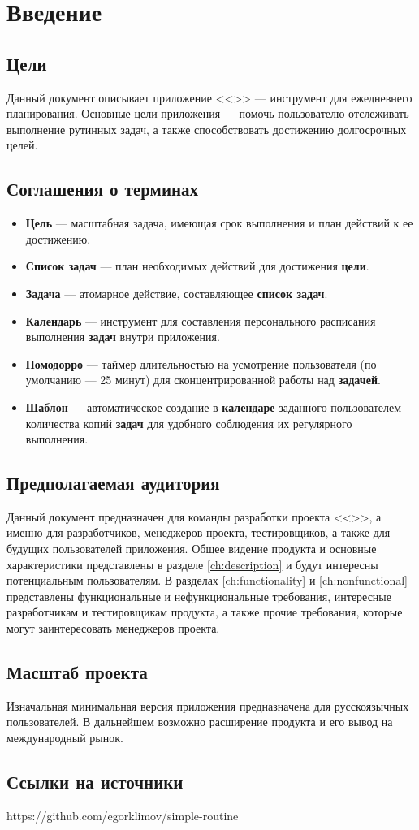 \chapter{Введение}
\section{Цели}
Данный документ описывает приложение <<\vProjectName>> --- инструмент для ежедневнего планирования. Основные цели приложения --- помочь пользователю отслеживать выполнение рутинных задач, а также способствовать достижению долгосрочных целей.

\section{Соглашения о терминах}
\begin{itemize}
    \item \textbf{Цель} --- масштабная задача, имеющая срок выполнения и план действий к ее достижению.
    \item \textbf{Список задач} --- план необходимых действий для достижения \textbf{цели}.
    \item \textbf{Задача} --- атомарное действие, составляющее \textbf{список задач}.
    \item \textbf{Календарь} --- инструмент для составления персонального расписания выполнения \textbf{задач} внутри приложения.
    \item \textbf{Помодорро} --- таймер длительностью на усмотрение пользователя (по умолчанию --- 25 минут) для сконцентрированной работы над \textbf{задачей}.
    \item \textbf{Шаблон} --- автоматическое создание в \textbf{календаре} заданного пользователем количества копий \textbf{задач} для удобного соблюдения их регулярного выполнения.
\end{itemize}


\section{Предполагаемая аудитория}
Данный документ предназначен для команды разработки проекта <<\vProjectName>>, а именно для разработчиков, менеджеров проекта, тестировщиков, а также для будущих пользователей приложения. Общее видение продукта и основные характеристики представлены в разделе \ref{ch:description} и будут интересны потенциальным пользователям. В разделах \ref{ch:functionality} и \ref{ch:nonfunctional} представлены функциональные и нефункциональные требования, интересные разработчикам и тестировщикам продукта, а также прочие требования, которые могут заинтересовать менеджеров проекта. 

\section{Масштаб проекта}
Изначальная минимальная версия приложения предназначена для русскоязычных пользователей. В дальнейшем возможно расширение продукта и его вывод на международный рынок.

\section{Ссылки на источники}
https://github.com/egorklimov/simple-routine